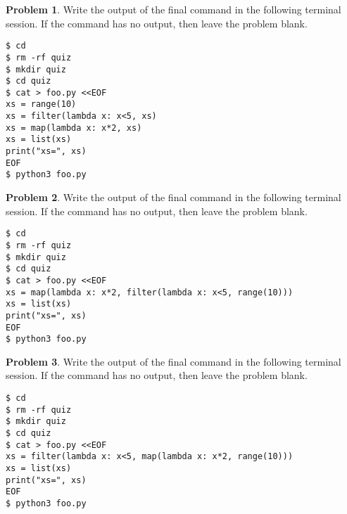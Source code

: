 \documentclass[10pt]{article}
\theoremstyle{definition}
\newtheorem{problem}{Problem}
\begin{document}
\begin{problem}
    Write the output of the final command in the following terminal session.
    If the command has no output, then leave the problem blank.
\end{problem}
\begin{lstlisting}
$ cd
$ rm -rf quiz
$ mkdir quiz
$ cd quiz
$ cat > foo.py <<EOF
xs = range(10)
xs = filter(lambda x: x<5, xs)
xs = map(lambda x: x*2, xs)
xs = list(xs)
print("xs=", xs)
EOF
$ python3 foo.py
\end{lstlisting}
\vspace{0.4in}

\begin{problem}
    Write the output of the final command in the following terminal session.
    If the command has no output, then leave the problem blank.
\end{problem}
\begin{lstlisting}
$ cd
$ rm -rf quiz
$ mkdir quiz
$ cd quiz
$ cat > foo.py <<EOF
xs = map(lambda x: x*2, filter(lambda x: x<5, range(10)))
xs = list(xs)
print("xs=", xs)
EOF
$ python3 foo.py
\end{lstlisting}
\vspace{0.4in}

\begin{problem}
    Write the output of the final command in the following terminal session.
    If the command has no output, then leave the problem blank.
\end{problem}
\begin{lstlisting}
$ cd
$ rm -rf quiz
$ mkdir quiz
$ cd quiz
$ cat > foo.py <<EOF
xs = filter(lambda x: x<5, map(lambda x: x*2, range(10)))
xs = list(xs)
print("xs=", xs)
EOF
$ python3 foo.py
\end{lstlisting}
\vspace{0.4in}
\end{document}

